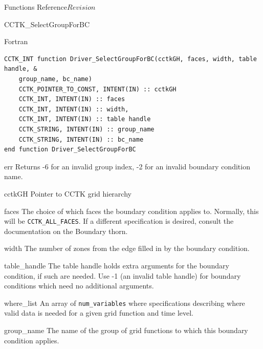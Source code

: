 \begin{cactuspart}{ Functions Reference}{}{$Revision$}
\begin{FunctionDescription}{CCTK\_SelectGroupForBC}
\begin{SynopsisSection}
\begin{Synopsis}{Fortran}
\begin{verbatim}
CCTK_INT function Driver_SelectGroupForBC(cctkGH, faces, width, table handle, &
    group_name, bc_name)
    CCTK_POINTER_TO_CONST, INTENT(IN) :: cctkGH
    CCTK_INT, INTENT(IN) :: faces
    CCTK_INT, INTENT(IN) :: width,
    CCTK_INT, INTENT(IN) :: table handle
    CCTK_STRING, INTENT(IN) :: group_name
    CCTK_STRING, INTENT(IN) :: bc_name
end function Driver_SelectGroupForBC
\end{verbatim}
\end{Synopsis}
\end{SynopsisSection}

\begin{ResultSection}
\begin{Result}{err}
Returns -6 for an invalid group index, -2 for an invalid boundary condition name.
\end{Result}
\end{ResultSection}

\begin{ParameterSection}
\begin{Parameter}{cctkGH}
Pointer to CCTK grid hierarchy
\end{Parameter}

\begin{Parameter}{faces}
The choice of which faces the boundary condition applies to.
Normally, this will be \texttt{CCTK\_ALL\_FACES}. If a different
specification is desired, consult the documentation on the
Boundary thorn.
\end{Parameter}

\begin{Parameter}{width}
The number of zones from the edge filled in by the boundary condition.
\end{Parameter}

\begin{Parameter}{table\_handle}
The table handle holds extra arguments for the boundary condition, if such are needed. Use
-1 (an invalid table handle) for boundary conditions which need no additional arguments.
\end{Parameter}

\begin{Parameter}{where\_list}
An array of \texttt{num\_variables} where specifications describing
where valid data is needed for a given grid function and time level.
\end{Parameter}

\begin{Parameter}{group\_name}
The name of the group of grid functions to which this boundary condition applies.
\end{Parameter}


\end{ParameterSection}
\end{FunctionDescription}
\end{cactuspart}

